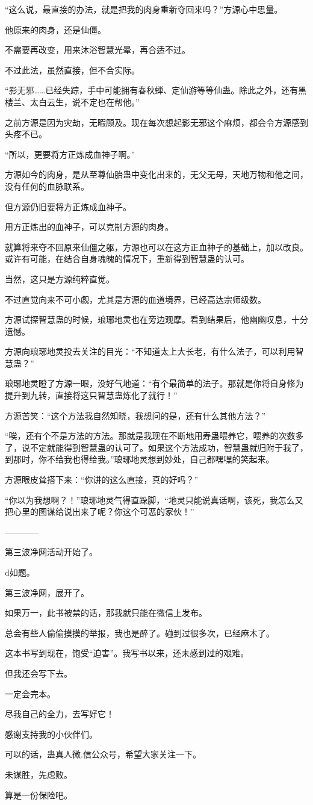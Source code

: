 \begin{this_body}
“这么说，最直接的办法，就是把我的肉身重新夺回来吗？”方源心中思量。

他原来的肉身，还是仙僵。

不需要再改变，用来沐浴智慧光晕，再合适不过。

不过此法，虽然直接，但不合实际。

“影无邪……已经失踪，手中可能拥有春秋蝉、定仙游等等仙蛊。除此之外，还有黑楼兰、太白云生，说不定也在帮他。”

之前方源是因为灾劫，无暇顾及。现在每次想起影无邪这个麻烦，都会令方源感到头疼不已。

“所以，更要将方正炼成血神子啊。”

方源如今的肉身，是从至尊仙胎蛊中变化出来的，无父无母，天地万物和他之间，没有任何的血脉联系。

但方源仍旧要将方正炼成血神子。

用方正炼出的血神子，可以克制方源的肉身。

就算将来夺不回原来仙僵之躯，方源也可以在这方正血神子的基础上，加以改良。或许有可能，在结合自身魂魄的情况下，重新得到智慧蛊的认可。

当然，这只是方源纯粹直觉。

不过直觉向来不可小觑，尤其是方源的血道境界，已经高达宗师级数。

方源试探智慧蛊的时候，琅琊地灵也在旁边观摩。看到结果后，他幽幽叹息，十分遗憾。

方源向琅琊地灵投去关注的目光：“不知道太上大长老，有什么法子，可以利用智慧蛊？”

琅琊地灵瞪了方源一眼，没好气地道：“有个最简单的法子。那就是你将自身修为提升到九转，直接将这只智慧蛊炼化了就行！”

方源苦笑：“这个方法我自然知晓，我想问的是，还有什么其他方法？”

“唉，还有个不是方法的方法。那就是我现在不断地用寿蛊喂养它，喂养的次数多了，说不定就能得到智慧蛊的认可了。如果这个方法成功，智慧蛊就归附于我了，到那时，你不给我也得给我。”琅琊地灵想到妙处，自己都嘿嘿的笑起来。

方源眼皮耸搭下来：“你讲的这么直接，真的好吗？”

“你以为我想啊？！”琅琊地灵气得直跺脚，“地灵只能说真话啊，该死，我怎么又把心里的图谋给说出来了呢？你这个可恶的家伙！”

------------

第三波净网活动开始了。

d如题。

第三波净网，展开了。

如果万一，此书被禁的话，那我就只能在微信上发布。

总会有些人偷偷摸摸的举报，我也是醉了。碰到过很多次，已经麻木了。

这本书写到现在，饱受“迫害”。我写书以来，还未感到过的艰难。

但我还会写下去。

一定会完本。

尽我自己的全力，去写好它！

感谢支持我的小伙伴们。

可以的话，蛊真人微.信公众号，希望大家关注一下。

未谋胜，先虑败。

算是一份保险吧。

\end{this_body}

